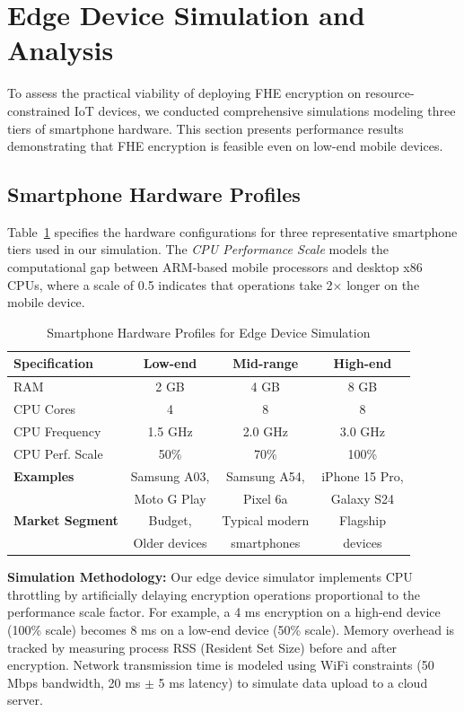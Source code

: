 \documentclass[review]{elsarticle}
\begin{document}
\section{Edge Device Simulation and Analysis}
\label{sec:edge-device-simulation}

To assess the practical viability of deploying FHE encryption on resource-constrained IoT devices, we conducted comprehensive simulations modeling three tiers of smartphone hardware. This section presents performance results demonstrating that FHE encryption is feasible even on low-end mobile devices.

\subsection{Smartphone Hardware Profiles}

Table~\ref{tab:device-profiles} specifies the hardware configurations for three representative smartphone tiers used in our simulation. The \textit{CPU Performance Scale} models the computational gap between ARM-based mobile processors and desktop x86 CPUs, where a scale of 0.5 indicates that operations take 2$\times$ longer on the mobile device.

\begin{table}[!t]
\caption{Smartphone Hardware Profiles for Edge Device Simulation}
\label{tab:device-profiles}
\centering
\small
\begin{tabular}{|l|c|c|c|}
\hline
\textbf{Specification} & \textbf{Low-end} & \textbf{Mid-range} & \textbf{High-end} \\
\hline
RAM & 2 GB & 4 GB & 8 GB \\
\hline
CPU Cores & 4 & 8 & 8 \\
\hline
CPU Frequency & 1.5 GHz & 2.0 GHz & 3.0 GHz \\
\hline
CPU Perf. Scale & 50\% & 70\% & 100\% \\
\hline
\textbf{Examples} & Samsung A03, & Samsung A54, & iPhone 15 Pro, \\
& Moto G Play & Pixel 6a & Galaxy S24 \\
\hline
\textbf{Market Segment} & Budget, & Typical modern & Flagship \\
& Older devices & smartphones & devices \\
\hline
\end{tabular}
\end{table}

\textbf{Simulation Methodology:} Our edge device simulator implements CPU throttling by artificially delaying encryption operations proportional to the performance scale factor. For example, a 4 ms encryption on a high-end device (100\% scale) becomes 8 ms on a low-end device (50\% scale). Memory overhead is tracked by measuring process RSS (Resident Set Size) before and after encryption. Network transmission time is modeled using WiFi constraints (50 Mbps bandwidth, 20 ms $\pm$ 5 ms latency) to simulate data upload to a cloud server.
\end{document}
